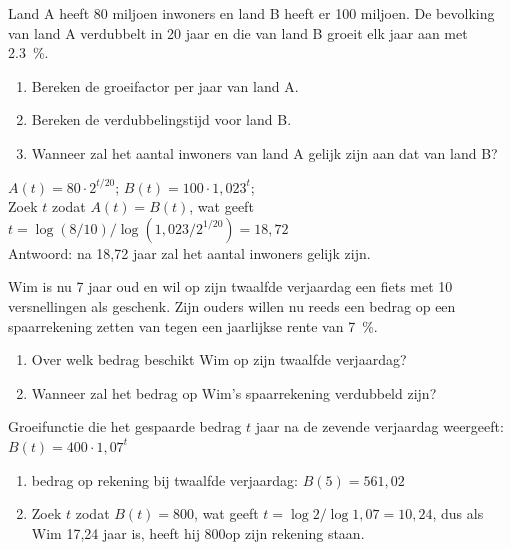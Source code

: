 \begin{oef}
Land A heeft 80 miljoen inwoners en land B heeft er 100
miljoen. De bevolking van land A verdubbelt in 20 jaar en die
van land B groeit elk jaar aan met \SI{2,3}{\percent}.
\begin{enumerate}
  \item Bereken de groeifactor per jaar van land A.
  \item Bereken de verdubbelingstijd voor land B.
  \item Wanneer zal het aantal inwoners van land A gelijk zijn
        aan dat van land B?
\end{enumerate}
\begin{opl}
$A(t)=80\cdot 2^{t/20}$; $B(t)=100\cdot 1,023^t$;\\
Zoek $t$ zodat $A(t)=B(t)$, wat geeft $t=\log(8/10)/\log(1,023/2^{1/20})=18,72$\\
Antwoord: na 18,72 jaar zal het aantal inwoners gelijk zijn.
\end{opl}
\end{oef}

\begin{oef}
Wim is nu 7 jaar oud en wil op zijn twaalfde
verjaardag een
fiets met 10 versnellingen als geschenk. Zijn ouders willen nu
reeds een bedrag op een spaarrekening zetten van  tegen een
jaarlijkse rente van \SI{7}{\percent}.
\begin{enumerate}
  \item Over welk bedrag beschikt Wim op zijn twaalfde verjaardag?
  \item Wanneer zal het bedrag op Wim's spaarrekening verdubbeld zijn?
\end{enumerate}
\begin{opl}
  Groeifunctie die het gespaarde bedrag $t$ jaar na de zevende verjaardag weergeeft: $B(t)=400\cdot 1,07^t$\\
  \begin{enumerate}
    \item bedrag op rekening bij twaalfde verjaardag: $B(5)=561,02$
    \item Zoek $t$ zodat $B(t)=800$, wat geeft $t=\log2/\log1,07=10,24$, dus als Wim 17,24 jaar is, heeft hij 800\euros op zijn rekening staan.
  \end{enumerate}
\end{opl}
\end{oef}

